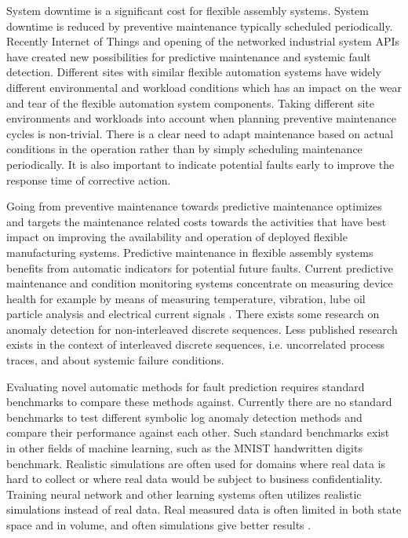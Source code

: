 \documentclass[journal]{IEEEtran}
\begin{document}
System downtime is a significant cost for flexible assembly systems. System downtime is reduced by preventive maintenance typically scheduled periodically.
Recently Internet of Things and opening of the networked industrial system APIs have created new possibilities for predictive maintenance and systemic fault detection. Different sites with similar
flexible automation systems have widely different environmental and workload conditions which has an impact on the wear and tear of the flexible automation system components.
Taking different site environments and workloads into account when planning preventive maintenance cycles is non-trivial. There is a clear need to adapt maintenance based on actual
conditions in the operation rather than by simply scheduling maintenance periodically\cite{hashemian2011state}.
It is also important to indicate potential faults early to improve the response time of corrective action.

Going from preventive maintenance towards predictive maintenance optimizes and targets the maintenance related costs towards the activities that have best impact
on improving the availability and operation of deployed flexible manufacturing systems.
Predictive maintenance in flexible assembly systems benefits from automatic indicators for potential future faults.
Current predictive maintenance and condition monitoring systems concentrate on measuring device health for example by means of measuring temperature\cite{mobley2002introduction},
vibration\cite{scheffer2004practical}, lube oil particle analysis\cite{hunt1993handbook} and electrical current signals
\cite{thomson2001current}. There exists some research on anomaly detection for non-interleaved discrete sequences\cite{chandola2012anomaly}.
Less published research exists in the context of interleaved discrete sequences, i.e. uncorrelated process traces, and about systemic failure conditions.

Evaluating novel automatic methods for fault prediction requires standard benchmarks to compare these methods against. Currently there are no standard benchmarks to test
different symbolic log anomaly detection methods and compare their performance against each other. Such standard benchmarks exist in other fields of machine learning,
such as the MNIST handwritten digits benchmark\cite{lecun-mnisthandwrittendigit-2010}. Realistic simulations are often used\cite{jager2014assessing} for domains where
real data is hard to collect or where real data would be subject to business confidentiality. Training neural network and other learning systems often utilizes realistic
simulations instead of real data. Real measured data is often limited in both state space and in volume, and often simulations give better results \cite{duch2005artificial}.
\end{document}
